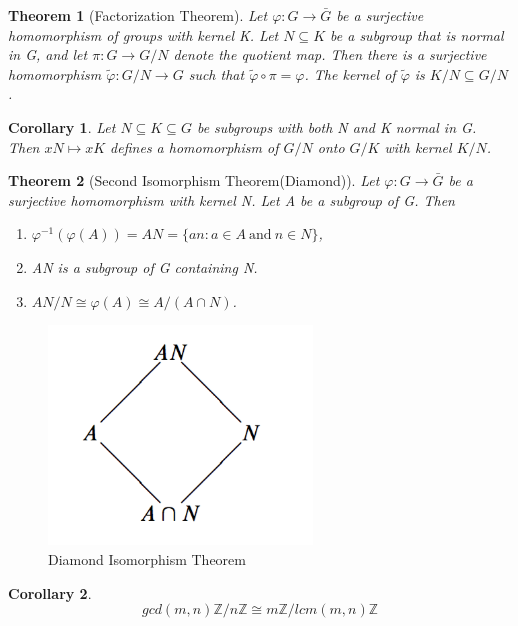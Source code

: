 \documentclass[12pt]{article}
\newtheorem{theorem}{Theorem}[subsection]
\newtheorem{corollary}{Corollary}[subsection]
\begin{document}
        \begin{theorem}[Factorization Theorem]
            Let $\varphi: G \rightarrow \bar{G}$ be a surjective homomorphism of groups with kernel K. Let $N\subseteq K$ be a subgroup that is normal in G, and let $\pi: G \rightarrow G/N$ denote the quotient map. Then there is a surjective homomorphism $\tilde{\varphi}: G/N \rightarrow G$ such that $\tilde{\varphi} \circ \pi = \varphi$. The kernel of $\tilde{\varphi}$ is $K/N \subseteq G/N$.
        \end{theorem}
        \begin{corollary}
            Let $N \subseteq K \subseteq G$ be subgroups with both N and K normal in G. Then $xN \mapsto xK$ defines a homomorphism of $G/N$ onto $G/K$ with kernel $K/N$.
        \end{corollary}
        \begin{theorem}[Second Isomorphism Theorem(Diamond)]
            Let $\varphi: G \rightarrow \bar{G}$ be a surjective homomorphism with kernel N. Let A be a subgroup of G. Then
            \begin{enumerate}
                \item $\varphi^{-1}(\varphi(A)) = AN = \{an : a \in A\ \mathrm{and}\ n \in N\}$,
                \item AN is a subgroup of G containing N.
                \item $AN/N \cong \varphi(A) \cong A/(A \cap N)$.
            \end{enumerate}
        \end{theorem}
        \begin{figure}[H]
        \begin{center}
        \includegraphics[width=7cm]{./Img/diamond.png}
        \caption{Diamond Isomorphism Theorem}
        \end{center}
        \end{figure}
        
        \begin{corollary}
        	\[gcd(m, n)\mathbb{Z}/n\mathbb{Z} \cong m\mathbb{Z} / lcm(m, n)\mathbb{Z}\]
        \end{corollary}
        
\end{document}
